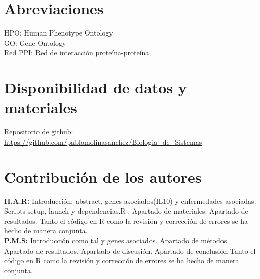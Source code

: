 \documentclass{bmcart}
\begin{document}
	\begin{backmatter}
	
		\section*{Abreviaciones}%
		HPO: Human Phenotype Ontology \\
		GO: Gene Ontology \\
		Red PPI: Red de interacción proteína-proteína
		
		\section*{Disponibilidad de datos y materiales}%
		Repositorio de github: \url{https://github.com/pablomolinasanchez/Biologia_de_Sistemas}
		
		\section*{Contribución de los autores}
		\textbf{H.A.R:} Introducción: abstract, genes asociados(IL10) y enfermedades asociadas. Scripts setup, launch y dependencias.R . Apartado de materiales. Apartado de resultados. Tanto el código en R como la revisión y corrección de errores se ha hecho de manera conjunta. \\
		\textbf{P.M.S:} Introducción como tal y genes asociados. Apartado de métodos. Apartado de resultados. Apartado de discusión. Apartado de conclusión Tanto el código en R como la revisión y corrección de errores se ha hecho de manera conjunta.
			
		
		
	\end{backmatter}
\end{document}
